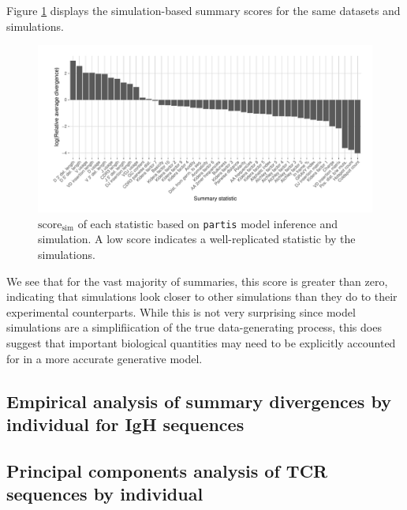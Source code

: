 \documentclass{article}
\begin{document}
Figure \ref{fig:SimScoresBCR} displays the simulation-based summary scores for the same datasets and simulations.
\begin{figure}
    \includegraphics[width=\linewidth]{Figures/PartisScores/sim_score_plot.pdf}
    \caption{$\text{score}_\text{sim}$ of each statistic based on \texttt{partis} model inference and simulation.
        A low score indicates a well-replicated statistic by the simulations.
    }
    \label{fig:SimScoresBCR}
\end{figure}

We see that for the vast majority of summaries, this score is greater than zero, indicating that simulations look closer to other simulations than they do to their experimental counterparts.
While this is not very surprising since model simulations are a simplifiication of the true data-generating process, this does suggest that important biological quantities may need to be explicitly accounted for in a more accurate generative model.


\subsection*{Empirical analysis of summary divergences by individual for IgH sequences}

\subsection*{Principal components analysis of TCR sequences by individual}
\end{document}
